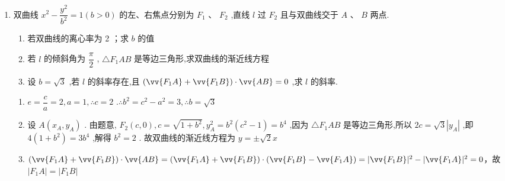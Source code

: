\begin{enumerate}
\begin{jieda}
\begin{enumerate}
            \item 直线$AB: x = m_1y+1$，直线$MN: x = my+4$
            
            $m_1 = \dfrac{x_1-x_2}{y_1-y_2} = \dfrac{\dfrac{y_1^2}{4} - \dfrac{y_2^2}{4}}{y_1-y_2} = \dfrac{y_1+y_2}{4}$，同理$m = \dfrac{y_3+y_4}{4}$，故$m = 2m_1$

            
        \end{enumerate}
    \end{jieda}

    \item 双曲线 ${x}^{2} - \dfrac{{y}^{2}}{{b}^{2}} = 1\left( {b > 0}\right)$ 的左、右焦点分别为 ${F}_{1}$ 、 ${F}_{2}$ ,直线 $l$ 过 ${F}_{2}$ 且与双曲线交于 $A$ 、 $B$ 两点.
    \begin{enumerate}
        \item 若双曲线的离心率为 2 ；求 $b$ 的值
        \item 若 $l$ 的倾斜角为 $\dfrac{\pi }{2}$ , $\bigtriangleup {F}_{1}{AB}$ 是等边三角形,求双曲线的渐近线方程
        \item 设 $b = \sqrt{3}$ ,若 $l$ 的斜率存在,且 $\left( {\vv{{F}_{1}A} + \vv{{F}_{1}B}}\right)  \cdot  \vv{AB} = 0$ ,求  $l$ 的斜率.
    \end{enumerate}
    \begin{jieda}
        \begin{enumerate}
            \item $e = \dfrac{c}{a} = 2,a = 1,\therefore c = 2$ .$\therefore {b}^{2} = {c}^{2} - {a}^{2} = 3,\therefore b = \sqrt{3}$ 
            
            \item 设 $A\left( {{x}_{A},{y}_{A}}\right)$ . 由题意, ${F}_{2}\left( {c,0}\right) ,c = \sqrt{1 + {b}^{2}},{y}_{A}^{2} = {b}^{2}\left( {{c}^{2} - 1}\right)  = {b}^{4}$ ,因为 $\bigtriangleup {F}_{1}{AB}$ 是等边三角形,所以 ${2c} = \sqrt{3}\left| {y}_{A}\right|$ ,即 $4\left( {1 + {b}^{2}}\right)  = 3{b}^{4}$ ,解得 ${b}^{2} = 2$ . 故双曲线的渐近线方程为 $y =  \pm  \sqrt{2}x$
            \item 
             $\left( {\vv{{F}_{1}A} + \vv{{F}_{1}B}}\right)  \cdot  \vv{AB} = \left( {\vv{{F}_{1}A} + \vv{{F}_{1}B}}\right) \cdot \left( {\vv{{F}_{1}B} - \vv{{F}_{1}A}}\right) = |\vv{F_1B}|^2 - |\vv{F_1A}|^2 = 0$，故$|F_1A| = |F_1B|$


\end{enumerate}
\end{jieda}
\end{enumerate}
